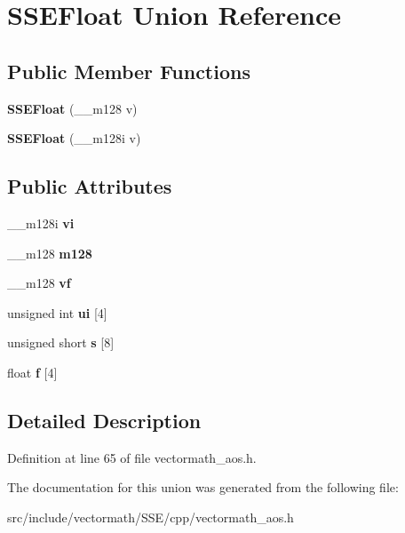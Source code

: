 \hypertarget{unionSSEFloat}{\section{S\-S\-E\-Float Union Reference}
\label{unionSSEFloat}
}
\subsection*{Public Member Functions}
\begin{DoxyCompactItemize}
\item 
\hypertarget{unionSSEFloat_a5338f71202408d7521712695b644fe92}{{\bfseries S\-S\-E\-Float} (\-\_\-\-\_\-m128 v)}\label{unionSSEFloat_a5338f71202408d7521712695b644fe92}

\item 
\hypertarget{unionSSEFloat_a31b48cfb8af4d4b843a0a20535360ee1}{{\bfseries S\-S\-E\-Float} (\-\_\-\-\_\-m128i v)}\label{unionSSEFloat_a31b48cfb8af4d4b843a0a20535360ee1}

\end{DoxyCompactItemize}
\subsection*{Public Attributes}
\begin{DoxyCompactItemize}
\item 
\hypertarget{unionSSEFloat_a6b8f496a26c177ab482ccb8a36c73ddb}{\-\_\-\-\_\-m128i {\bfseries vi}}\label{unionSSEFloat_a6b8f496a26c177ab482ccb8a36c73ddb}

\item 
\hypertarget{unionSSEFloat_a43b3ec91b2407216ad6f50dbb40969b1}{\-\_\-\-\_\-m128 {\bfseries m128}}\label{unionSSEFloat_a43b3ec91b2407216ad6f50dbb40969b1}

\item 
\hypertarget{unionSSEFloat_a8fcfcd25220108144aa83e3161ff71eb}{\-\_\-\-\_\-m128 {\bfseries vf}}\label{unionSSEFloat_a8fcfcd25220108144aa83e3161ff71eb}

\item 
\hypertarget{unionSSEFloat_a2dc78905cd1baf7ef65141e319c09326}{unsigned int {\bfseries ui} \mbox{[}4\mbox{]}}\label{unionSSEFloat_a2dc78905cd1baf7ef65141e319c09326}

\item 
\hypertarget{unionSSEFloat_a30e3c6643eacca62af8d074f5e9bef63}{unsigned short {\bfseries s} \mbox{[}8\mbox{]}}\label{unionSSEFloat_a30e3c6643eacca62af8d074f5e9bef63}

\item 
\hypertarget{unionSSEFloat_aa6095e2b885a2b0d49e880a95865d256}{float {\bfseries f} \mbox{[}4\mbox{]}}\label{unionSSEFloat_aa6095e2b885a2b0d49e880a95865d256}

\end{DoxyCompactItemize}


\subsection{Detailed Description}


Definition at line 65 of file vectormath\-\_\-aos.\-h.



The documentation for this union was generated from the following file\-:\begin{DoxyCompactItemize}
\item 
src/include/vectormath/\-S\-S\-E/cpp/vectormath\-\_\-aos.\-h\end{DoxyCompactItemize}
